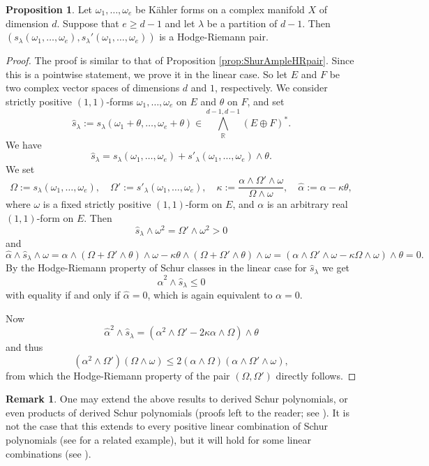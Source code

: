 \documentclass[a4,reqno]{amsart}
\theoremstyle{definition}
\newtheorem{proposition}[theorem]{Proposition}
\newtheorem{remark}[theorem]{Remark}
\newcommand{\R}{\mathbb{R}}
\numberwithin{equation}{section}
\begin{document}
\begin{proposition}\label{prop:ShurHRpair}
Let $\omega_1,\ldots,\omega_e$ be K\"ahler forms on a complex manifold $X$ of dimension $d$. Suppose that $e \ge d-1$ and let $\lambda$ be a partition of $d-1$. Then $(s_\lambda(\omega_1,\ldots,\omega_e),s_\lambda'(\omega_1,\ldots,\omega_e))$ is a Hodge-Riemann pair.
\end{proposition}
\begin{proof}
The proof is similar to that of Proposition \ref{prop:ShurAmpleHRpair}.  Since this is a pointwise statement, we prove it in the linear case. So let $E$ and $F$ be two complex vector spaces of dimensions $d$ and $1$, respectively. We consider strictly positive $(1,1)$-forms $\omega_1,\ldots,\omega_e$ on $E$ and $\theta$ on $F$, and set 
\[
    \hat{s}_\lambda := s_\lambda(\omega_1 + \theta,\ldots,\omega_e + \theta) \in \bigwedge_{\R}^{d-1,d-1} (E \oplus F)^*.
\]
We have
\[
    \hat{s}_\lambda = s_\lambda(\omega_1,\ldots,\omega_e) + s'_\lambda(\omega_1,\ldots,\omega_e) \wedge \theta.
\]
We set 
\[
    \Omega := s_\lambda(\omega_1,\ldots,\omega_e), \quad \Omega' := s'_\lambda(\omega_1,\ldots,\omega_e), \quad \kappa := \frac{\alpha \wedge \Omega' \wedge \omega}{\Omega \wedge \omega}, \quad \hat{\alpha}:=\alpha-\kappa\theta,
\]
where $\omega$ is a fixed strictly positive $(1,1)$-form on $E$, and $\alpha$ is an arbitrary real $(1,1)$-form on $E$. 
Then 
\[
    \hat{s}_\lambda \wedge \omega^2 = \Omega' \wedge \omega^2>0
\]
and 
\[
    \hat{\alpha}\wedge\hat{s}_\lambda \wedge \omega =\alpha\wedge(\Omega+ \Omega'\wedge\theta) \wedge \omega-\kappa\theta\wedge(\Omega+ \Omega'\wedge\theta) \wedge \omega =(\alpha\wedge \Omega'\wedge\omega-\kappa\Omega\wedge\omega)\wedge\theta= 0.
\]
By the Hodge-Riemann property of Schur classes in the linear case for $\hat{s}_\lambda$ \cite[Theorem 10.2]{RossToma3} we get
\[
    \hat{\alpha}^2\wedge\hat{s}_\lambda \le 0
\]
with equality if and only if $\hat{\alpha}=0$, which is again equivalent to $\alpha=0$.

Now 
\[
    \hat{\alpha}^2\wedge\hat{s}_\lambda =
    (\alpha^2\wedge\Omega'-2\kappa\alpha\wedge\Omega)\wedge\theta
\]
and thus
\[
    (\alpha^2\wedge\Omega')(\Omega\wedge\omega)\le2(\alpha\wedge\Omega)(\alpha\wedge\Omega'\wedge\omega),
\]
from which the Hodge-Riemann property of the pair
$(\Omega,\Omega')$ directly follows.
\end{proof}

\begin{remark}\label{rmk:otherpolynomials}
One may extend the above results to derived Schur polynomials, or even products of derived Schur polynomials (proofs left to the reader; see \cite[Section 5.2]{RossToma1}).   It is not the case that this extends to every positive linear combination of Schur polynomials (see \cite[Remark 9.3]{RossToma1} for a related example), but it will hold for some linear combinations (see \cite[Section 9]{RossToma2}).
\end{remark}
\end{document}
